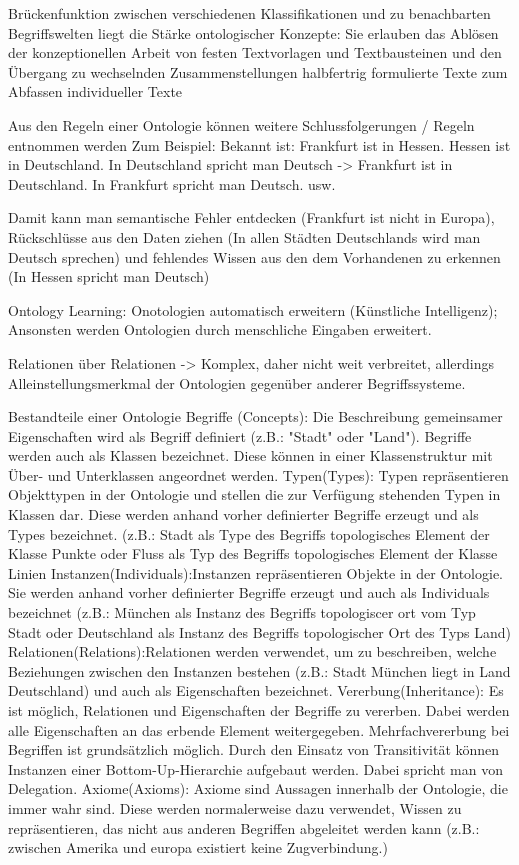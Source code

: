 	Brückenfunktion zwischen verschiedenen Klassifikationen und zu benachbarten Begriffswelten liegt die Stärke ontologischer Konzepte: Sie erlauben das Ablösen der konzeptionellen Arbeit von festen Textvorlagen und Textbausteinen und den Übergang zu wechselnden Zusammenstellungen halbfertrig formulierte Texte zum Abfassen individueller Texte
	
Aus den Regeln einer Ontologie können weitere Schlussfolgerungen / Regeln entnommen werden
	Zum Beispiel: Bekannt ist: Frankfurt ist in Hessen. Hessen ist in Deutschland. In Deutschland spricht man Deutsch -> Frankfurt ist in Deutschland. In Frankfurt spricht man Deutsch.
	usw.
	
	Damit kann man semantische Fehler entdecken (Frankfurt ist nicht in Europa), Rückschlüsse aus den Daten ziehen (In allen Städten Deutschlands wird man Deutsch sprechen) und fehlendes Wissen aus den dem Vorhandenen zu erkennen (In Hessen spricht man Deutsch)
	
	Ontology Learning: Onotologien automatisch erweitern (Künstliche Intelligenz); Ansonsten werden Ontologien durch menschliche Eingaben erweitert.
	
	Relationen über Relationen -> Komplex, daher nicht weit verbreitet, allerdings Alleinstellungsmerkmal der Ontologien gegenüber anderer Begriffssysteme.
	
Bestandteile einer Ontologie
	Begriffe (Concepts): Die Beschreibung gemeinsamer Eigenschaften wird als Begriff definiert (z.B.: "Stadt" oder "Land"). Begriffe werden auch als Klassen bezeichnet. Diese können in einer Klassenstruktur mit Über- und Unterklassen angeordnet werden.
	Typen(Types): Typen repräsentieren Objekttypen in der Ontologie und stellen die zur Verfügung stehenden Typen in Klassen dar. Diese werden anhand vorher definierter Begriffe erzeugt und als Types bezeichnet. (z.B.: Stadt als Type des Begriffs topologisches Element der Klasse Punkte oder Fluss als Typ des Begriffs topologisches Element der Klasse Linien
	Instanzen(Individuals):Instanzen repräsentieren Objekte in der Ontologie. Sie werden anhand vorher definierter Begriffe erzeugt und auch als Individuals bezeichnet (z.B.: München als Instanz des Begriffs topologiscer ort vom Typ Stadt oder Deutschland als Instanz des Begriffs topologischer Ort des Typs Land)
	Relationen(Relations):Relationen werden verwendet, um zu beschreiben, welche Beziehungen zwischen den Instanzen bestehen (z.B.: Stadt München liegt in Land Deutschland) und auch als Eigenschaften bezeichnet.
	Vererbung(Inheritance): Es ist möglich, Relationen und Eigenschaften der Begriffe zu vererben. Dabei werden alle Eigenschaften an das erbende Element weitergegeben. Mehrfachvererbung bei Begriffen ist grundsätzlich möglich. Durch den Einsatz von Transitivität können Instanzen einer Bottom-Up-Hierarchie aufgebaut werden. Dabei spricht man von Delegation.
	Axiome(Axioms): Axiome sind Aussagen innerhalb der Ontologie, die immer wahr sind. Diese werden normalerweise dazu verwendet, Wissen zu repräsentieren, das nicht aus anderen Begriffen abgeleitet werden kann (z.B.: zwischen Amerika und europa existiert keine Zugverbindung.)
	
